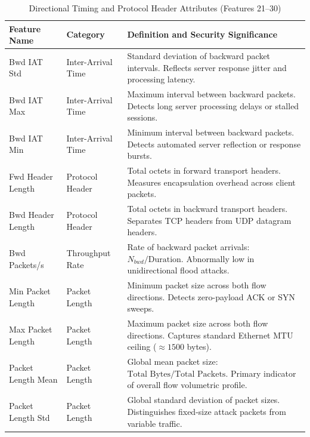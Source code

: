 \documentclass[12pt,a4paper]{report}
\begin{document}
\begin{table}[H]
\centering
\small
\renewcommand{\arraystretch}{1.15}
\begin{tabularx}{\textwidth}{|p{4.3cm}|p{2.8cm}|X|}
\hline
\textbf{Feature Name} & \textbf{Category} & \textbf{Definition and Security Significance} \\
\hline
Bwd IAT Std & Inter-Arrival Time & Standard deviation of backward packet intervals. Reflects server response jitter and processing latency. \\
\hline
Bwd IAT Max & Inter-Arrival Time & Maximum interval between backward packets. Detects long server processing delays or stalled sessions. \\
\hline
Bwd IAT Min & Inter-Arrival Time & Minimum interval between backward packets. Detects automated server reflection or response bursts. \\
\hline
Fwd Header Length & Protocol Header & Total octets in forward transport headers. Measures encapsulation overhead across client packets. \\
\hline
Bwd Header Length & Protocol Header & Total octets in backward transport headers. Separates TCP headers from UDP datagram headers. \\
\hline
Bwd Packets/s & Throughput Rate & Rate of backward packet arrivals: $N_{bwd} / \text{Duration}$. Abnormally low in unidirectional flood attacks. \\
\hline
Min Packet Length & Packet Length & Minimum packet size across both flow directions. Detects zero-payload ACK or SYN sweeps. \\
\hline
Max Packet Length & Packet Length & Maximum packet size across both flow directions. Captures standard Ethernet MTU ceiling ($\approx 1500$ bytes). \\
\hline
Packet Length Mean & Packet Length & Global mean packet size: $\text{Total Bytes} / \text{Total Packets}$. Primary indicator of overall flow volumetric profile. \\
\hline
Packet Length Std & Packet Length & Global standard deviation of packet sizes. Distinguishes fixed-size attack packets from variable traffic. \\
\hline
\end{tabularx}
\caption{Directional Timing and Protocol Header Attributes (Features 21--30)}
\label{tab:feature_dictionary_part3}
\end{table}
\end{document}
